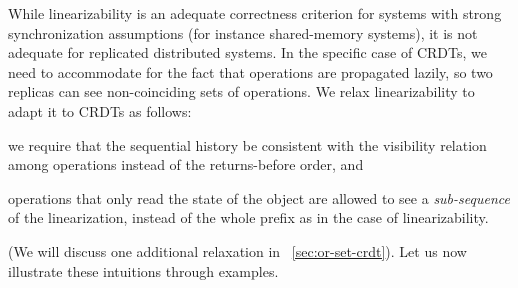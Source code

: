 While linearizability is an adequate correctness criterion for
systems with strong synchronization assumptions (for instance
shared-memory systems), it is not adequate for replicated distributed
systems.
%
In the specific case of CRDTs, we need to accommodate for the fact
that operations are propagated lazily, so two replicas can see
non-coinciding sets of operations.
%
We relax linearizability to adapt it to CRDTs as follows:
\begin{inparaenum}
\item we require that the sequential history be consistent with
the visibility relation among operations instead of the returns-before order, and
\item operations that only read the state of the object are allowed
to see a \emph{sub-sequence} of the linearization, instead of
the whole prefix as in the case of linearizability.
\end{inparaenum}
(We will discuss one additional relaxation in \sectionautorefname~\ref{sec:or-set-crdt}).
%
%
Let us now illustrate these intuitions through examples.

